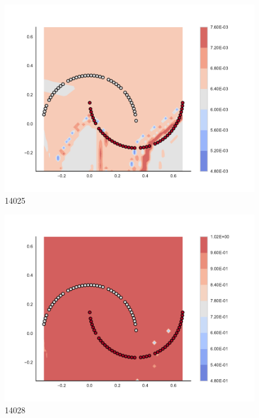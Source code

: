 \begin{subfigure}[b]{0.09\textwidth}
    \includegraphics[clip, trim=2.35cm 1.75cm 4.5cm 0cm,width=\textwidth]{img/convergence/14025.pdf}
    \caption{14025}
    \label{fig:convergence_14025}
\end{subfigure}
%
\begin{subfigure}[b]{0.09\textwidth}
    \includegraphics[clip, trim=2.35cm 1.75cm 4.5cm 0cm,width=\textwidth]{img/convergence/14028.pdf}
    \caption{14028}
    \label{fig:convergence_14028}
\end{subfigure}
%
